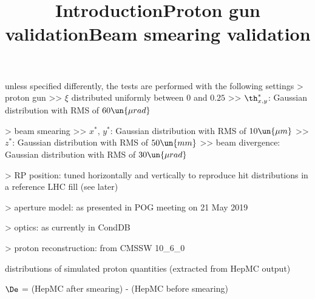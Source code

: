 \def\today{%
	\number\day
	\space
	\ifcase\month\or
	January\or February\or March\or April\or May\or June\or
	July\or August\or September\or October\or November\or December
	\fi
	\space
	\number\year
}

\newpage %

\def\author{J.~Kašpar}
\def\caption{Proton simulation validation, \PeriodLabel}
\def\date{\today}

\iffalse
* single-rp reco

* multi-rp reco
 - resolution
 - impact of misalignment
 - impact of optics systematics
\fi

\newpage %
\title{Introduction}

\> unless specified differently, the tests are performed with the following settings
\>> proton gun
\>>> $\xi$ distributed uniformly between $0$ and $0.25$
\>>> $\th^*_{x, y}$: Gaussian distribution with RMS of $60\un{\mu rad}$

\>> beam smearing
\>>> $x^*$, $y^*$: Gaussian distribution with RMS of $10\un{\mu m}$
\>>> $z^*$: Gaussian distribution with RMS of $50\un{mm}$
\>>> beam divergence: Gaussian distribution with RMS of $30\un{\mu rad}$

\>> RP position: tuned horizontally and vertically to reproduce hit distributions in a reference LHC fill (see later)

\>> aperture model: as presented in POG meeting on 21 May 2019

\>> optics: as currently in CondDB

\>> proton reconstruction: from CMSSW 10\_6\_0


\newpage %
\title{Proton gun validation}

\SmallerFonts

\> distributions of simulated proton quantities (extracted from HepMC output)

\centerline{}



\newpage %
\title{Beam smearing validation}

\SmallerFonts

\> $\De$ = (HepMC after smearing) - (HepMC before smearing)

